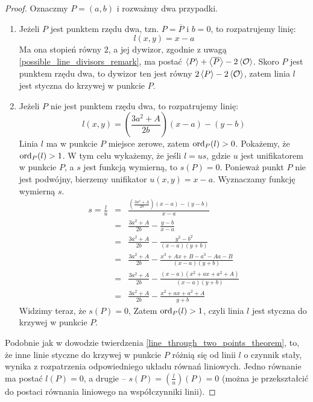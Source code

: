 \begin{proof}
Oznaczmy $P = (a, b)$ i rozważmy dwa przypadki.
\begin{enumerate}
\item
Jeżeli $P$ jest punktem rzędu dwa, tzn. $P = \overline{P}$ i $b = 0$,
to rozpatrujemy linię:
\begin{equation}
l(x, y) = x - a
\end{equation}
Ma ona stopień równy $2$,
a jej dywizor, zgodnie z uwagą \ref{possible_line_divisors_remark},
ma postać $\left\langle P\right\rangle + \left\langle\overline{P}\right\rangle - 2\left\langle\mathcal{O}\right\rangle$.
Skoro $P$ jest punktem rzędu dwa, to dywizor ten jest równy
$2\left\langle P\right\rangle - 2\left\langle\mathcal{O}\right\rangle$,
zatem linia $l$ jest styczna do krzywej w punkcie $P$.
\item
Jeżeli $P$ nie jest punktem rzędu dwa,
to rozpatrujemy linię:
\begin{equation}
l(x, y) = \left(\frac{3a^2 + A}{2b}\right)(x - a) - (y - b)
\end{equation}
Linia $l$ ma w punkcie $P$ miejsce zerowe, zatem $\operatorname{ord}_P(l) > 0$.
Pokażemy, że $\operatorname{ord}_P(l) > 1$.
W tym celu wykażemy, że jeśli $l = us$,
gdzie $u$ jest unifikatorem w punkcie $P$,
a $s$ jest funkcją wymierną,
to $s(P) = 0$.
Ponieważ punkt $P$ nie jest podwójny,
bierzemy unifikator $u(x, y) = x - a$.
Wyznaczamy funkcję wymierną $s$.
\begin{eqnarray*}
s = \frac{l}{u}
& = & \frac{\left(\frac{3a^2+A}{2b}\right)(x-a) - (y-b)}{x-a} \\
& = & \frac{3a^2+A}{2b} - \frac{y-b}{x-a} \\
& = & \frac{3a^2+A}{2b} - \frac{y^2-b^2}{(x-a)(y+b)} \\
& = & \frac{3a^2+A}{2b} - \frac{x^3+Ax+B - a^3-Aa-B}{(x-a)(y+b)} \\
& = & \frac{3a^2+A}{2b} - \frac{(x-a)(x^2+ax+a^2+A)}{(x-a)(y+b)} \\
& = & \frac{3a^2+A}{2b} - \frac{x^2+ax+a^2+A}{y+b}
\end{eqnarray*}
Widzimy teraz, że $s(P) = 0$,
Zatem $\operatorname{ord}_P(l) > 1$, czyli linia $l$ jest styczna do krzywej w punkcie $P$.
\end{enumerate}

\noindent
Podobnie jak w dowodzie twierdzenia \ref{line_through_two_points_theorem},
to, że inne linie styczne do krzywej w punkcie $P$ różnią się od linii $l$
o czynnik stały, wynika z rozpatrzenia odpowiedniego układu równań liniowych.
Jedno równanie ma postać $l(P) = 0$, a drugie --
$s(P) = (\frac{l}{u})(P) = 0$
(można je przekształcić do postaci równania liniowego na współczynniki linii).
\end{proof}

